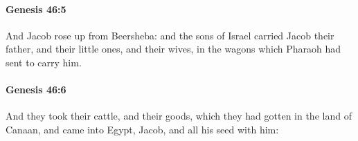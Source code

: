 		\paragraph{Genesis 46:5} %
			\label{GENESIS-46-5}

			And Jacob rose up from Beersheba: and the sons of Israel carried Jacob their father, and their little ones, and their wives, in the wagons which Pharaoh had sent to carry him.


		\paragraph{Genesis 46:6} %
			\label{GENESIS-46-6}

			And they took their cattle, and their goods, which they had gotten in the land of Canaan, and came into Egypt, Jacob, and all his seed with him:



